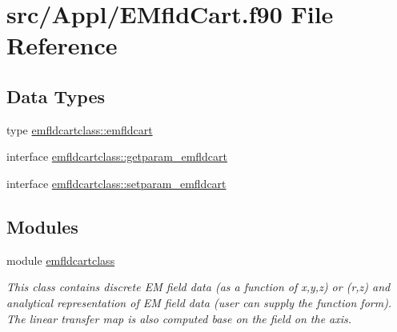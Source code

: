 \hypertarget{_e_mfld_cart_8f90}{}\section{src/\+Appl/\+E\+Mfld\+Cart.f90 File Reference}
\label{_e_mfld_cart_8f90}
\subsection*{Data Types}
\begin{DoxyCompactItemize}
\item 
type \mbox{\hyperlink{namespaceemfldcartclass_structemfldcartclass_1_1emfldcart}{emfldcartclass\+::emfldcart}}
\item 
interface \mbox{\hyperlink{interfaceemfldcartclass_1_1getparam__emfldcart}{emfldcartclass\+::getparam\+\_\+emfldcart}}
\item 
interface \mbox{\hyperlink{interfaceemfldcartclass_1_1setparam__emfldcart}{emfldcartclass\+::setparam\+\_\+emfldcart}}
\end{DoxyCompactItemize}
\subsection*{Modules}
\begin{DoxyCompactItemize}
\item 
module \mbox{\hyperlink{namespaceemfldcartclass}{emfldcartclass}}
\begin{DoxyCompactList}\small\item\em This class contains discrete EM field data (as a function of x,y,z) or (r,z) and analytical representation of EM field data (user can supply the function form). The linear transfer map is also computed base on the field on the axis. \end{DoxyCompactList}\end{DoxyCompactItemize}
